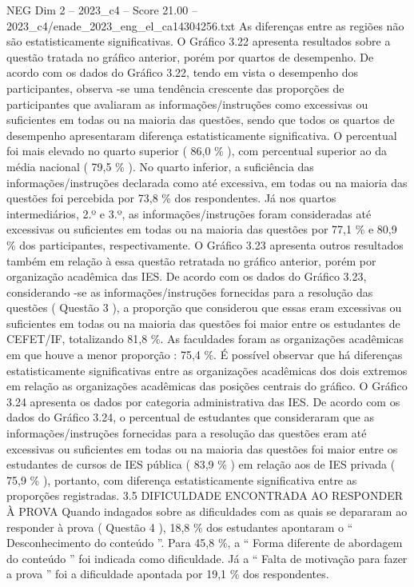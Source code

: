 \begin{textsample}{NEG Dim 2 – 2023\_c4 – Score 21.00 – 2023\_c4/enade\_2023\_eng\_el\_ca14304256.txt}
As diferenças entre as regiões não são estatisticamente significativas.
O Gráfico 3.22 apresenta resultados sobre a questão tratada no gráfico anterior, porém por quartos de desempenho.
De acordo com os dados do Gráfico 3.22, tendo em vista o desempenho dos participantes, observa -se uma tendência crescente das proporções de participantes que avaliaram as informações/instruções como excessivas ou suficientes em todas ou na maioria das questões, sendo que todos os quartos de desempenho apresentaram diferença estatisticamente significativa.
O percentual foi mais elevado no quarto superior ( 86,0 \% ), com percentual superior ao da média nacional ( 79,5 \% ).
No quarto inferior, a suficiência das informações/instruções declarada como até excessiva, em todas ou na maioria das questões foi percebida por 73,8 \% dos respondentes.
Já nos quartos intermediários, 2.º e 3.º, as informações/instruções foram consideradas até excessivas ou suficientes em todas ou na maioria das questões por 77,1 \% e 80,9 \% dos participantes, respectivamente.
O Gráfico 3.23 apresenta outros resultados também em relação à essa questão retratada no gráfico anterior, porém por organização acadêmica das IES.
De acordo com os dados do Gráfico 3.23, considerando -se as informações/instruções fornecidas para a resolução das questões ( Questão 3 ), a proporção que considerou que essas eram excessivas ou suficientes em todas ou na maioria das questões foi maior entre os estudantes de CEFET/IF, totalizando 81,8 \%.
As faculdades foram as organizações acadêmicas em que houve a menor proporção : 75,4 \%.
É possível observar que há diferenças estatisticamente significativas entre as organizações acadêmicas dos dois extremos em relação as organizações acadêmicas das posições centrais do gráfico.
O Gráfico 3.24 apresenta os dados por categoria administrativa das IES.
De acordo com os dados do Gráfico 3.24, o percentual de estudantes que consideraram que as informações/instruções fornecidas para a resolução das questões eram até excessivas ou suficientes em todas ou na maioria das questões foi maior entre os estudantes de cursos de IES pública ( 83,9 \% ) em relação aos de IES privada ( 75,9 \% ), portanto, com diferença estatisticamente significativa entre as proporções registradas. 3.5 DIFICULDADE ENCONTRADA AO RESPONDER À PROVA Quando indagados sobre as dificuldades com as quais se depararam ao responder à prova ( Questão 4 ), 18,8 \% dos estudantes apontaram o “ Desconhecimento do conteúdo ”.
Para 45,8 \%, a “ Forma diferente de abordagem do conteúdo ” foi indicada como dificuldade.
Já a “ Falta de motivação para fazer a prova ” foi a dificuldade apontada por 19,1 \% dos respondentes.

\end{textsample}
